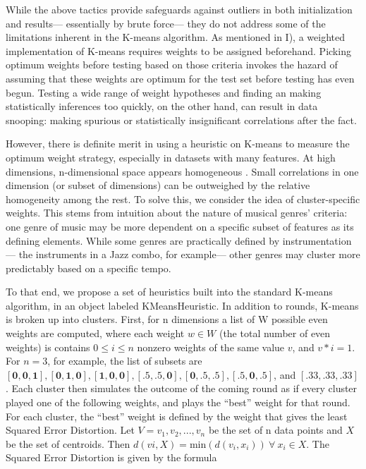\documentclass[10pt,twocolumn]{article}
\begin{document}
While the above tactics provide safeguards against outliers in both initialization and results— essentially by brute force— they do not address some of the limitations inherent in the K-means algorithm. As mentioned in I), a weighted implementation of K-means requires weights to be assigned beforehand. Picking optimum weights before testing based on those criteria invokes the hazard of assuming that these weights are optimum for the test set before testing has even begun. Testing a wide range of weight hypotheses and finding an making statistically inferences too quickly, on the other hand, can result in data snooping: making spurious or statistically insignificant correlations after the fact.


However, there is definite merit in using a heuristic on K-means to measure the optimum weight strategy, especially in datasets with many features. At high dimensions, n-dimensional space appears homogeneous \cite{KumarErtoz}.  Small correlations in one dimension (or subset of dimensions) can be outweighed by the relative homogeneity among the rest. To solve this, we consider the idea of cluster-specific weights. This stems from intuition about the nature of musical genres’ criteria: one genre of music may be more dependent on a specific subset of features as its defining elements. While some genres are practically defined by instrumentation— the instruments in a Jazz combo, for example— other genres may cluster more predictably based on a specific tempo. 


To that end, we propose a set of heuristics built into the standard K-means algorithm, in an object labeled KMeansHeuristic. In addition to rounds, K-means is broken up into clusters. First, for n dimensions a list of W possible even weights are computed, where each weight $w \in W$ (the total number of even weights) is contains $0 \leq i \leq n$ nonzero weights of the same value $v$, and $v*i = 1$. For $n = 3$, for example, the list of subsets are $\mathbf{[0, 0, 1]}, \mathbf{[0, 1, 0]}, \mathbf{[1, 0, 0]}, \mathbf{[.5, .5, 0]}, \mathbf{[0, .5, .5]}, \mathbf{[.5, 0, .5]}$, and $\mathbf{[.33, .33, .33]}$. Each cluster then simulates the outcome of the coming round as if every cluster played one of the following weights, and plays the “best” weight for that round. For each cluster, the “best” weight is defined by the weight that gives the least Squared Error Distortion. Let $V = {v_1,v_2,...,v_n}$ be the set of n data points and $X$ be the set of centroids. Then $d(vi, X) = \mathrm{min}(d(v_i, x_i))\: \forall \: x_i \in X$. The Squared Error Distortion is given by the formula 
\end{document}
